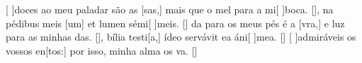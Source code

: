 {    {[ ]{do}ces ao meu paladar são as [sas,] mais que o mel para a mi[ ]{bo}ca. [\LinkPT]},
  {na pédibus meis [um] et lumen sémi[ ]{me}is. [\LinkLA]}%
    {da para os meus pés é a [vra,] e luz para as minhas das. [\LinkPT]},
  {bília testi[a,] ídeo servávit ea áni[ ]{me}a. [\LinkLA]}%
    {[ ]{ad}miráveis os vossos en[tos:] por isso, minha alma os va. [\LinkPT]}
}